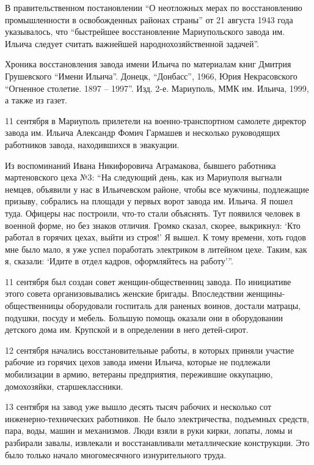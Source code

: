 В правительственном постановлении \enquote{О неотложных мерах по восстановлению
промышленности в освобожденных районах страны} от 21 августа 1943 года
указывалось, что \enquote{быстрейшее восстановление Мариупольского завода им. Ильича
следует считать важнейшей народнохозяйственной задачей}.

Хроника восстановления завода имени Ильича по материалам книг Дмитрия
Грушевского \enquote{Имени Ильича}. Донецк, \enquote{Донбасс}, 1966, Юрия Некрасовского
\enquote{Огненное столетие. 1897 – 1997}. Изд. 2-е. Мариуполь, ММК им. Ильича, 1999, а
также из газет.


11 сентября в Мариуполь прилетели на военно-транспортном самолете директор
завода им. Ильича Александр Фомич Гармашев и несколько руководящих работников
завода, находившихся в эвакуации.

Из воспоминаний Ивана Никифоровича Аграмакова, бывшего работника мартеновского
цеха №3: \enquote{На следующий день, как из Мариуполя выгнали немцев, объявили у нас в
Ильичевском районе, чтобы все мужчины, подлежащие призыву, собрались на площади
у первых ворот завода им. Ильича. Я пошел туда. Офицеры нас построили, что-то
стали объяснять. Тут появился человек в военной форме, но без знаков отличия.
Громко сказал, скорее, выкрикнул: \enquote{Кто работал в горячих цехах, выйти из
строя!} Я вышел. К тому времени, хоть годов мне было мало, я уже успел
поработать электриком в литейном цехе. Таким, как я, сказали: \enquote{Идите в отдел
кадров, оформляйтесь на работу}}.

11 сентября был создан совет женщин-общественниц завода. По инициативе этого
совета организовывались женские бригады. Впоследствии женщины-общественницы
оборудовали госпиталь для раненых воинов, достали матрацы, подушки, посуду и
мебель. Большую помощь оказали они в оборудовании детского дома им. Крупской и
в определении в него детей-сирот.

12 сентября начались восстановительные работы, в которых приняли участие
рабочие из горячих цехов завода имени Ильича, которые не подлежали мобилизации
в армию, ветераны предприятия, пережившие оккупацию, домохозяйки,
старшеклассники.

13 сентября на завод уже вышло десять тысяч рабочих и несколько сот
инженерно-технических работников. Не было электричества, подъемных средств,
пара, воды, машин и механизмов. Люди взяли в руки кирки, лопаты, ломы и
разбирали завалы, извлекали и восстанавливали металлические
кон­струкции. Это было только начало многомесячного изнурительного труда.


